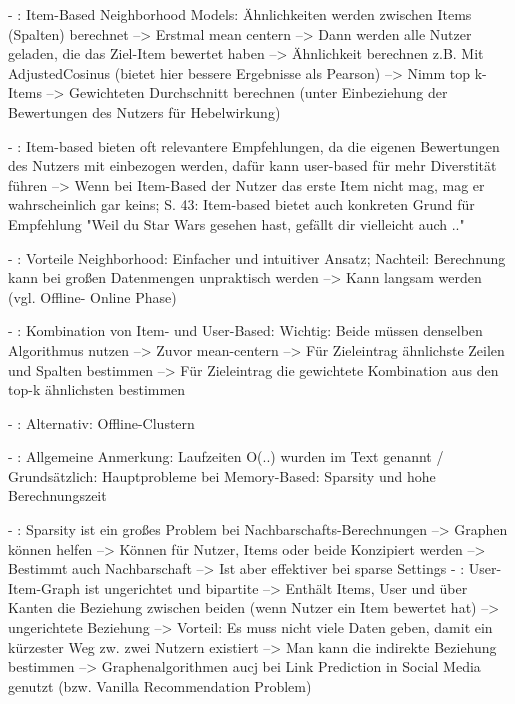 - \cite[S. 40f.]{recommenderSystems:2016}: Item-Based Neighborhood Models: Ähnlichkeiten werden zwischen Items (Spalten) berechnet --> Erstmal mean centern --> Dann werden alle Nutzer geladen, die das Ziel-Item bewertet haben --> Ähnlichkeit berechnen z.B. Mit AdjustedCosinus (bietet hier bessere Ergebnisse als Pearson) --> Nimm top k-Items --> Gewichteten Durchschnitt berechnen (unter Einbeziehung der Bewertungen des Nutzers für Hebelwirkung)

- \cite[S. 42]{recommenderSystems:2016}: Item-based bieten oft relevantere Empfehlungen, da die eigenen Bewertungen des Nutzers mit einbezogen werden, dafür kann user-based für mehr Diverstität führen --> Wenn bei Item-Based der Nutzer das erste Item nicht mag, mag er wahrscheinlich gar keins; S. 43: Item-based bietet auch konkreten Grund für Empfehlung "Weil du Star Wars gesehen hast, gefällt dir vielleicht auch .."

- \cite[S. 44]{recommenderSystems:2016}: Vorteile Neighborhood: Einfacher und intuitiver Ansatz; Nachteil: Berechnung kann bei großen Datenmengen unpraktisch werden --> Kann langsam werden (vgl. Offline- Online Phase)

- \cite[S. 44]{recommenderSystems:2016}: Kombination von Item- und User-Based: Wichtig: Beide müssen denselben Algorithmus nutzen --> Zuvor mean-centern --> Für Zieleintrag ähnlichste Zeilen und Spalten bestimmen --> Für Zieleintrag die gewichtete Kombination aus den top-k ähnlichsten bestimmen

- \cite[S. 46]{recommenderSystems:2016}: Alternativ: Offline-Clustern

- \cite{recommenderSystems:2016}: Allgemeine Anmerkung: Laufzeiten O(..) wurden im Text genannt / Grundsätzlich: Hauptprobleme bei Memory-Based: Sparsity und hohe Berechnungszeit

- \cite[S. 60]{recommenderSystems:2016}: Sparsity ist ein großes Problem bei Nachbarschafts-Berechnungen  --> Graphen können helfen --> Können für Nutzer, Items oder beide Konzipiert werden --> Bestimmt auch Nachbarschaft --> Ist aber effektiver bei sparse Settings
- \cite[S. 61]{recommenderSystems:2016}: User-Item-Graph ist ungerichtet und bipartite --> Enthält Items, User und über Kanten die Beziehung zwischen beiden (wenn Nutzer ein Item bewertet hat) --> ungerichtete Beziehung --> Vorteil: Es muss nicht viele Daten geben, damit ein kürzester Weg zw. zwei Nutzern existiert --> Man kann die indirekte Beziehung bestimmen --> Graphenalgorithmen aucj bei Link Prediction in Social Media genutzt (bzw. Vanilla Recommendation Problem)

